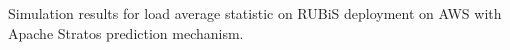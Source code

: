 \label{stratos} Simulation results for load average statistic on RUBiS deployment on AWS with Apache Stratos prediction mechanism.